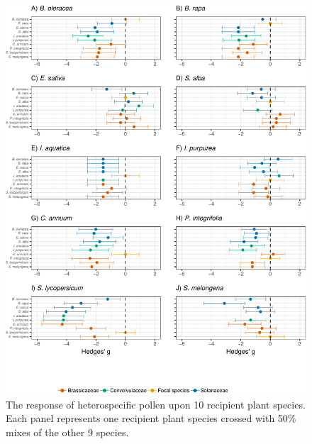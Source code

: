 \documentclass[11pt,a4paper]{article}
\begin{document}
\begin{figure}
\centering
\includegraphics{output/figures/unnamed-chunk-5-1.pdf}
\caption{The response of heterospecific pollen upon 10 recipient plant
species. Each panel represents one recipient plant species crossed with
50\% mixes of the other 9 species.}
\end{figure}

\newpage
\end{document}
